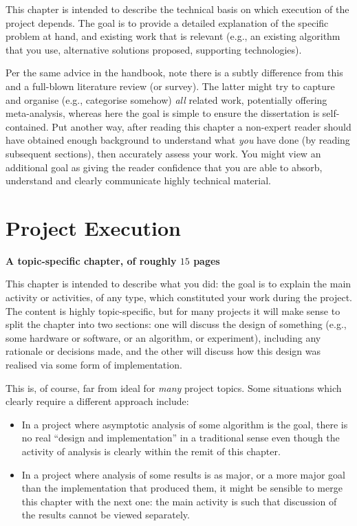 \documentclass[ %
                    author={Manan Vaswani},
                supervisor={Dr. Raphael Clifford},
                    degree={MEng},
                     title={A multi-core CPU implementation \n of the classical Boson Sampling algorithm},
                  subtitle={},
                      type={},
                      year={2019} ]{dissertation}
\begin{document}
\noindent
This chapter is intended to describe the technical basis on which execution
of the project depends.  The goal is to provide a detailed explanation of
the specific problem at hand, and existing work that is relevant (e.g., an
existing algorithm that you use, alternative solutions proposed, supporting
technologies).  

Per the same advice in the handbook, note there is a subtly difference from
this and a full-blown literature review (or survey).  The latter might try
to capture and organise (e.g., categorise somehow) {\em all} related work,
potentially offering meta-analysis, whereas here the goal is simple to
ensure the dissertation is self-contained.  Put another way, after reading 
this chapter a non-expert reader should have obtained enough background to 
understand what {\em you} have done (by reading subsequent sections), then 
accurately assess your work.  You might view an additional goal as giving 
the reader confidence that you are able to absorb, understand and clearly 
communicate highly technical material.


\chapter{Project Execution}
\label{chap:execution}

{\bf A topic-specific chapter, of roughly $15$ pages} 
\vspace{1cm} 

\noindent
This chapter is intended to describe what you did: the goal is to explain
the main activity or activities, of any type, which constituted your work 
during the project.  The content is highly topic-specific, but for many 
projects it will make sense to split the chapter into two sections: one 
will discuss the design of something (e.g., some hardware or software, or 
an algorithm, or experiment), including any rationale or decisions made, 
and the other will discuss how this design was realised via some form of 
implementation.  

This is, of course, far from ideal for {\em many} project topics.  Some
situations which clearly require a different approach include:

\begin{itemize}
\item In a project where asymptotic analysis of some algorithm is the goal,
      there is no real ``design and implementation'' in a traditional sense
      even though the activity of analysis is clearly within the remit of
      this chapter.
\item In a project where analysis of some results is as major, or a more
      major goal than the implementation that produced them, it might be
      sensible to merge this chapter with the next one: the main activity 
      is such that discussion of the results cannot be viewed separately.
\end{itemize}
\end{document}
